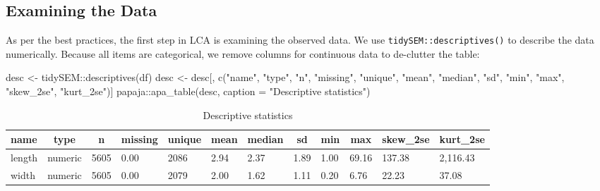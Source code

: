 \documentclass[
  man,floatsintext]{apa6}
\newenvironment{Shaded}{\begin{snugshade}}{\end{snugshade}}
\newcommand{\AttributeTok}[1]{\textcolor[rgb]{0.77,0.63,0.00}{#1}}
\newcommand{\FunctionTok}[1]{\textcolor[rgb]{0.00,0.00,0.00}{#1}}
\newcommand{\NormalTok}[1]{#1}
\newcommand{\OtherTok}[1]{\textcolor[rgb]{0.56,0.35,0.01}{#1}}
\newcommand{\SpecialCharTok}[1]{\textcolor[rgb]{0.00,0.00,0.00}{#1}}
\newcommand{\StringTok}[1]{\textcolor[rgb]{0.31,0.60,0.02}{#1}}
\begin{document}
\hypertarget{examining-the-data}{%
\subsection{Examining the Data}\label{examining-the-data}}

As per the best practices, the first step in LCA is examining the observed data.
We use \texttt{tidySEM::descriptives()} to describe the data numerically.
Because all items are categorical, we remove columns for continuous data to de-clutter the table:

\begin{Shaded}
\begin{Highlighting}[]
\NormalTok{desc }\OtherTok{\textless{}{-}}\NormalTok{ tidySEM}\SpecialCharTok{::}\FunctionTok{descriptives}\NormalTok{(df)}
\NormalTok{desc }\OtherTok{\textless{}{-}}\NormalTok{ desc[, }\FunctionTok{c}\NormalTok{(}\StringTok{"name"}\NormalTok{, }\StringTok{"type"}\NormalTok{, }\StringTok{"n"}\NormalTok{, }\StringTok{"missing"}\NormalTok{, }\StringTok{"unique"}\NormalTok{, }
\StringTok{"mean"}\NormalTok{, }\StringTok{"median"}\NormalTok{, }\StringTok{"sd"}\NormalTok{, }\StringTok{"min"}\NormalTok{, }\StringTok{"max"}\NormalTok{, }\StringTok{"skew\_2se"}\NormalTok{, }\StringTok{"kurt\_2se"}\NormalTok{)]}
\NormalTok{papaja}\SpecialCharTok{::}\FunctionTok{apa\_table}\NormalTok{(desc, }\AttributeTok{caption =} \StringTok{"Descriptive statistics"}\NormalTok{)}
\end{Highlighting}
\end{Shaded}

\begin{table}[tbp]

\begin{center}
\begin{threeparttable}

\caption{\label{tab:tabdesc}Descriptive statistics}

\begin{tabular}{llllllllllll}
\toprule
name & \multicolumn{1}{c}{type} & \multicolumn{1}{c}{n} & \multicolumn{1}{c}{missing} & \multicolumn{1}{c}{unique} & \multicolumn{1}{c}{mean} & \multicolumn{1}{c}{median} & \multicolumn{1}{c}{sd} & \multicolumn{1}{c}{min} & \multicolumn{1}{c}{max} & \multicolumn{1}{c}{skew\_2se} & \multicolumn{1}{c}{kurt\_2se}\\
\midrule
length & numeric & 5605 & 0.00 & 2086 & 2.94 & 2.37 & 1.89 & 1.00 & 69.16 & 137.38 & 2,116.43\\
width & numeric & 5605 & 0.00 & 2079 & 2.00 & 1.62 & 1.11 & 0.20 & 6.76 & 22.23 & 37.08\\
\bottomrule
\end{tabular}

\end{threeparttable}
\end{center}

\end{table}
\end{document}
